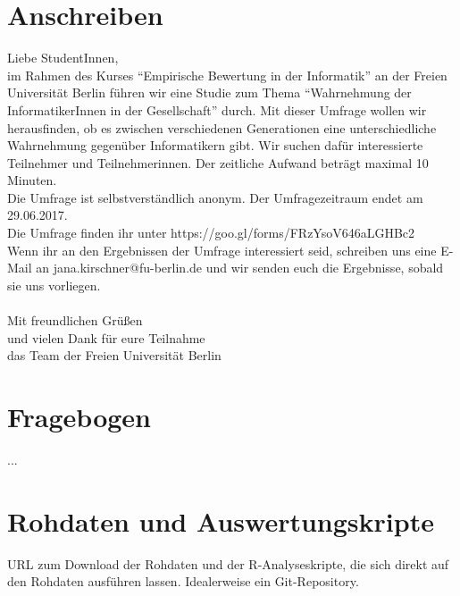 \documentclass[de]{agse-empir-report}\usepackage[]{graphicx}\usepackage[]{color}
\begin{document}



\appendix

\section{Anschreiben}

Liebe StudentInnen,\\
im Rahmen des Kurses “Empirische Bewertung in der Informatik” an der Freien Universität Berlin führen wir eine Studie zum Thema “Wahrnehmung der InformatikerInnen in der Gesellschaft” durch. Mit dieser Umfrage wollen wir herausfinden, ob es zwischen verschiedenen Generationen eine unterschiedliche Wahrnehmung gegenüber Informatikern gibt. Wir suchen dafür interessierte Teilnehmer und Teilnehmerinnen. Der zeitliche Aufwand beträgt maximal 10 Minuten.\\
Die Umfrage ist selbstverständlich anonym. Der Umfragezeitraum endet am 29.06.2017.\\

Die Umfrage finden ihr  unter https://goo.gl/forms/FRzYsoV646aLGHBc2 \\

Wenn ihr an den Ergebnissen der Umfrage interessiert seid, schreiben uns eine E-Mail an jana.kirschner@fu-berlin.de und wir senden euch die Ergebnisse, sobald sie uns vorliegen.\\ \\

Mit freundlichen Grüßen\\
und vielen Dank für eure Teilnahme\\ 
das Team der Freien Universität Berlin\\



\section{Fragebogen}

...


\section{Rohdaten und Auswertungskripte}

URL zum Download der Rohdaten und der R-Analyseskripte, die sich direkt auf den
Rohdaten ausführen lassen.
Idealerweise ein Git-Repository.
\end{document}
